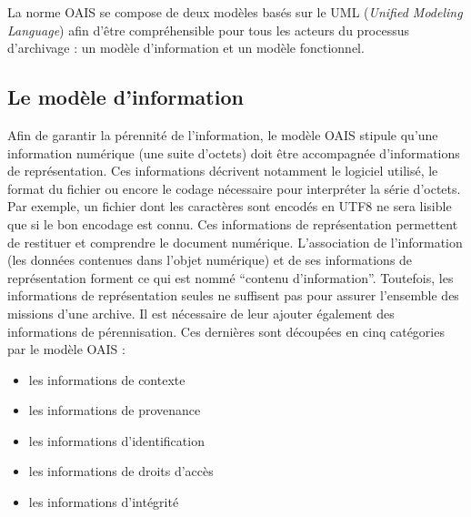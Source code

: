 

La norme \gls{OAIS} se compose de deux modèles basés sur le \gls{UML} (\textit{Unified Modeling Language}) afin d’être compréhensible pour tous les acteurs du processus d’archivage : un modèle d’information et un modèle fonctionnel.

\subsection{Le modèle d’information}
Afin de garantir la pérennité de l’information, le modèle \gls{OAIS} stipule qu'une information numérique (une suite d’octets) doit être accompagnée d'informations de représentation. Ces informations décrivent notamment le logiciel utilisé, le format du fichier ou encore le codage nécessaire pour interpréter la série d’octets. Par exemple, un fichier dont les caractères sont encodés en UTF8 ne sera lisible que si le bon encodage est connu. Ces informations de représentation permettent de restituer et comprendre le document numérique. L'association de l'information (les données contenues dans l'objet numérique) et de ses informations de représentation forment ce qui est nommé \enquote{contenu d'information}. Toutefois, les informations de représentation seules ne suffisent pas pour assurer  l’ensemble des missions d'une archive. Il est nécessaire de leur ajouter également des informations de pérennisation. Ces dernières sont découpées en cinq catégories par le modèle \gls{OAIS} : 
\begin{itemize}
	\item les informations de contexte
	\item les informations de provenance
	\item les informations d’identification 
	\item les informations de droits d’accès
	\item les informations d’intégrité
\end{itemize}


